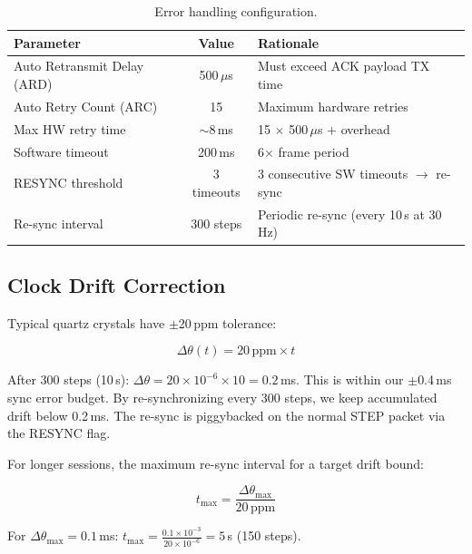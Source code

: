 \documentclass[11pt,a4paper]{article}
\begin{document}
\begin{table}[htbp]
\centering
\caption{Error handling configuration.}
\begin{tabular}{l c l}
\toprule
\textbf{Parameter} & \textbf{Value} & \textbf{Rationale} \\
\midrule
Auto Retransmit Delay (ARD) & 500\,$\mu$s & Must exceed ACK payload TX time \\
Auto Retry Count (ARC) & 15 & Maximum hardware retries \\
Max HW retry time & ${\sim}$8\,ms & 15 $\times$ 500\,$\mu$s + overhead \\
Software timeout & 200\,ms & 6$\times$ frame period \\
RESYNC threshold & 3 timeouts & 3 consecutive SW timeouts $\to$ re-sync \\
Re-sync interval & 300 steps & Periodic re-sync (every 10\,s at 30\,Hz) \\
\bottomrule
\end{tabular}
\label{tab:retry-config}
\end{table}

\subsection{Clock Drift Correction}

Typical quartz crystals have $\pm$20\,ppm tolerance:

\begin{equation}
\Delta\theta(t) = 20\,\text{ppm} \times t
\end{equation}

After 300 steps (10\,s): $\Delta\theta = 20 \times 10^{-6} \times 10 = 0.2$\,ms. This is within our $\pm$0.4\,ms sync error budget. By re-synchronizing every 300 steps, we keep accumulated drift below 0.2\,ms. The re-sync is piggybacked on the normal STEP packet via the RESYNC flag.

For longer sessions, the maximum re-sync interval for a target drift bound:

\begin{equation}
t_{\max} = \frac{\Delta\theta_{\max}}{20\,\text{ppm}}
\end{equation}

For $\Delta\theta_{\max} = 0.1$\,ms: $t_{\max} = \frac{0.1 \times 10^{-3}}{20 \times 10^{-6}} = 5$\,s (150 steps).

\end{document}
